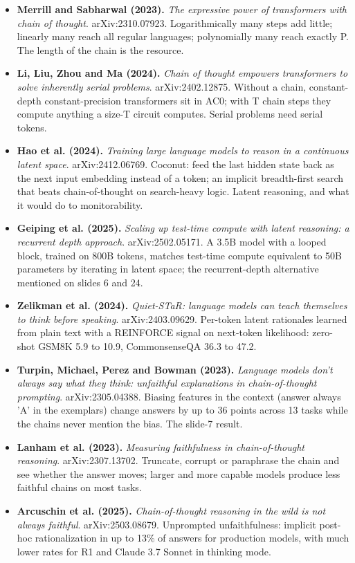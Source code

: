 \begin{itemize}[leftmargin=1.2em,itemsep=3pt]
\item \textbf{Merrill and Sabharwal (2023).} \textit{The expressive power of transformers with chain of thought}. arXiv:2310.07923. Logarithmically many steps add little; linearly many reach all regular languages; polynomially many reach exactly P. The length of the chain is the resource.
\item \textbf{Li, Liu, Zhou and Ma (2024).} \textit{Chain of thought empowers transformers to solve inherently serial problems}. arXiv:2402.12875. Without a chain, constant-depth constant-precision transformers sit in AC0; with T chain steps they compute anything a size-T circuit computes. Serial problems need serial tokens.
\item \textbf{Hao et al. (2024).} \textit{Training large language models to reason in a continuous latent space}. arXiv:2412.06769. Coconut: feed the last hidden state back as the next input embedding instead of a token; an implicit breadth-first search that beats chain-of-thought on search-heavy logic. Latent reasoning, and what it would do to monitorability.
\item \textbf{Geiping et al. (2025).} \textit{Scaling up test-time compute with latent reasoning: a recurrent depth approach}. arXiv:2502.05171. A 3.5B model with a looped block, trained on 800B tokens, matches test-time compute equivalent to 50B parameters by iterating in latent space; the recurrent-depth alternative mentioned on slides 6 and 24.
\item \textbf{Zelikman et al. (2024).} \textit{Quiet-STaR: language models can teach themselves to think before speaking}. arXiv:2403.09629. Per-token latent rationales learned from plain text with a REINFORCE signal on next-token likelihood: zero-shot GSM8K 5.9 to 10.9, CommonsenseQA 36.3 to 47.2.
\item \textbf{Turpin, Michael, Perez and Bowman (2023).} \textit{Language models don't always say what they think: unfaithful explanations in chain-of-thought prompting}. arXiv:2305.04388. Biasing features in the context (answer always 'A' in the exemplars) change answers by up to 36 points across 13 tasks while the chains never mention the bias. The slide-7 result.
\item \textbf{Lanham et al. (2023).} \textit{Measuring faithfulness in chain-of-thought reasoning}. arXiv:2307.13702. Truncate, corrupt or paraphrase the chain and see whether the answer moves; larger and more capable models produce less faithful chains on most tasks.
\item \textbf{Arcuschin et al. (2025).} \textit{Chain-of-thought reasoning in the wild is not always faithful}. arXiv:2503.08679. Unprompted unfaithfulness: implicit post-hoc rationalization in up to 13\% of answers for production models, with much lower rates for R1 and Claude 3.7 Sonnet in thinking mode.

\end{itemize}
